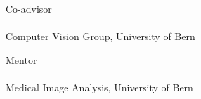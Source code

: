 \begin{titlepage}
\begin{center}
		\large{Co-advisor \\ \examname \\ Computer Vision Group, University of Bern}\vspace{0.5cm}

		\large{Mentor \\ \mentorname \\ Medical Image Analysis, University of Bern}\vspace{0.5cm}
		
	\end{center}
\end{titlepage}
\cleardoublepage





